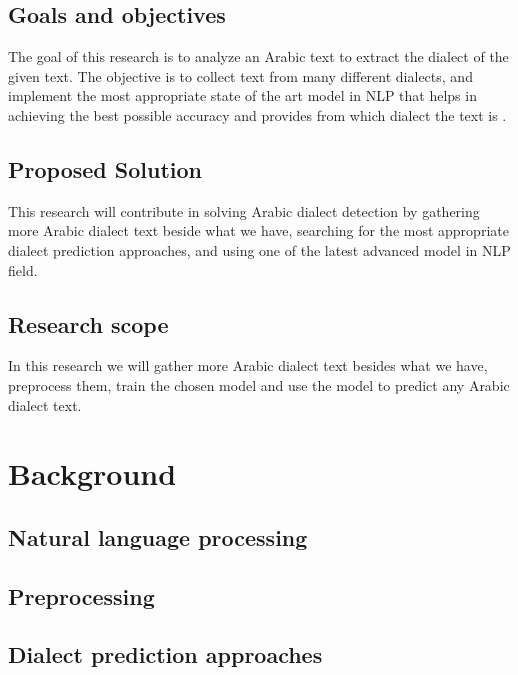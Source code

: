 \documentclass[12pt]{diazessay}
\begin{document}

    
    \subsection{Goals and objectives}
    
    The goal of this research is to analyze an Arabic text to extract the dialect of the given text.
    The objective is to collect text from many different dialects, and implement the most appropriate state of the art model in NLP that helps in achieving the best possible accuracy and provides from which dialect the text is .

    \subsection{Proposed Solution}
    
    This research will contribute in solving Arabic dialect detection by gathering more Arabic dialect text beside what we have, searching for the most appropriate dialect prediction approaches, and using one of the latest advanced model in NLP field.
    
    \subsection{Research scope}
    
    In this research we will gather more Arabic dialect text besides what we have, preprocess them, train the chosen model and use the model to predict any Arabic dialect text. 

\section{Background}

    \subsection{Natural language processing}
    
    \subsection{Preprocessing}

    \subsection{Dialect prediction approaches}
    
\end{document}
